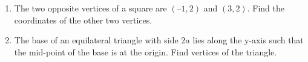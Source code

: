 \begin{enumerate}[label=\thesubsection.\arabic*,ref=\thesubsection.\theenumi]
\item The two opposite vertices of a square are $(–1, 2)$  and $ (3, 2)$. Find the coordinates of the other two vertices.
\\
\solution
	
\item The base of an equilateral triangle with side $2a$ lies along the y-axis such that the mid-point of the base is at the origin. Find vertices of the triangle.
\label{chapters/11/10/1/2}

\end{enumerate}
